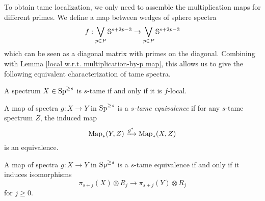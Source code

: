 To obtain tame localization, we only need to assemble the multiplication maps for different primes.
We define a map between wedges of sphere spectra
\begin{equation}
\label{f}
	f: \bigvee_{p\in P}{\mathbb{S}}^{s+2p-3} \to \bigvee_{p\in P}{\mathbb{S}}^{s+2p-3}
\end{equation}
which can be seen as a diagonal matrix with primes on the diagonal. Combining with Lemma \ref{local w.r.t. multiplication-by-p map}, this allows us to give the following equivalent characterization of tame spectra.
\begin{corollary}
	A spectrum $X\in \operatorname{Sp}^{\geq s}$ is $s$-tame if and only if it is $f$-local.
\end{corollary}

\begin{definition}
	A map of spectra $g:X\to Y$ in $\operatorname{Sp}^{\geq s}$ is a \emph{$s$-tame equivalence} if for any $s$-tame spectrum $Z$, the induced map
	\[
	\operatorname{Map}_*(Y,Z) \xrightarrow{g^*} \operatorname{Map}_*(X,Z)
	\]
	is an equivalence.
\end{definition}



\begin{proposition}
	A map of spectra $g:X\to Y$ in $\operatorname{Sp}^{\geq s}$ is a $s$-tame equivalence if and only if it induces isomorphisms
	\[
	\pi_{s+j}(X)\otimes R_j \to \pi_{s+j}(Y) \otimes R_j
	\]
	for $j\geq 0$.
\end{proposition}




%
%
%
%

